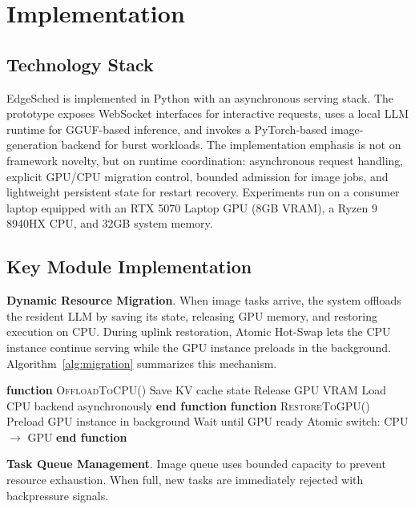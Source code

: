\section{Implementation}
\label{sec:implementation}

\subsection{Technology Stack}

EdgeSched is implemented in Python with an asynchronous serving stack. The prototype exposes WebSocket interfaces for interactive requests, uses a local LLM runtime for GGUF-based inference, and invokes a PyTorch-based image-generation backend for burst workloads. The implementation emphasis is not on framework novelty, but on runtime coordination: asynchronous request handling, explicit GPU/CPU migration control, bounded admission for image jobs, and lightweight persistent state for restart recovery. Experiments run on a consumer laptop equipped with an RTX 5070 Laptop GPU (8GB VRAM), a Ryzen 9 8940HX CPU, and 32GB system memory.

\subsection{Key Module Implementation}

\textbf{Dynamic Resource Migration}. When image tasks arrive, the system offloads the resident LLM by saving its state, releasing GPU memory, and restoring execution on CPU. During uplink restoration, Atomic Hot-Swap lets the CPU instance continue serving while the GPU instance preloads in the background. Algorithm~\ref{alg:migration} summarizes this mechanism.

\begin{algorithm}[!t]
\caption{Dynamic GPU-CPU Migration}
\label{alg:migration}
\begin{algorithmic}[1]
\STATE \textbf{function} \textsc{OffloadToCPU}()
\STATE \quad Save KV cache state
\STATE \quad Release GPU VRAM
\STATE \quad Load CPU backend asynchronously
\STATE \textbf{end function}
\STATE
\STATE \textbf{function} \textsc{RestoreToGPU}()
\STATE \quad Preload GPU instance in background
\STATE \quad Wait until GPU ready
\STATE \quad Atomic switch: CPU $\rightarrow$ GPU
\STATE \textbf{end function}
\end{algorithmic}
\end{algorithm}

\textbf{Task Queue Management}. Image queue uses bounded capacity to prevent resource exhaustion. When full, new tasks are immediately rejected with backpressure signals.


